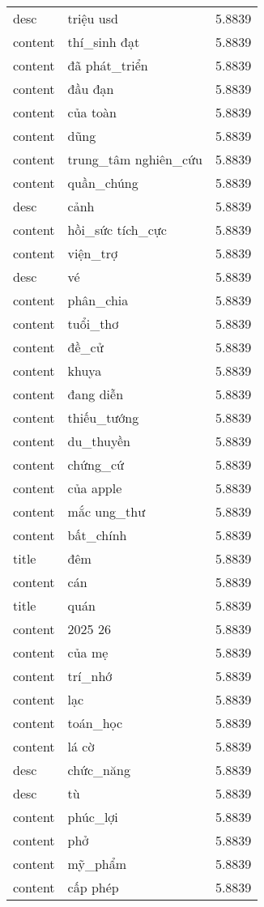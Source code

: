 \documentclass{article}
\begin{document}
\begin{tabular}{lll}
desc & triệu usd & 5.8839\\
content & thí\_sinh đạt & 5.8839\\
content & đã phát\_triển & 5.8839\\
content & đầu đạn & 5.8839\\
content & của toàn & 5.8839\\
content & dũng & 5.8839\\
content & trung\_tâm nghiên\_cứu & 5.8839\\
content & quần\_chúng & 5.8839\\
desc & cảnh & 5.8839\\
content & hồi\_sức tích\_cực & 5.8839\\
content & viện\_trợ & 5.8839\\
desc & vé & 5.8839\\
content & phân\_chia & 5.8839\\
content & tuổi\_thơ & 5.8839\\
content & đề\_cử & 5.8839\\
content & khuya & 5.8839\\
content & đang diễn & 5.8839\\
content & thiếu\_tướng & 5.8839\\
content & du\_thuyền & 5.8839\\
content & chứng\_cứ & 5.8839\\
content & của apple & 5.8839\\
content & mắc ung\_thư & 5.8839\\
content & bất\_chính & 5.8839\\
title & đêm & 5.8839\\
content & cán & 5.8839\\
title & quán & 5.8839\\
content & 2025 26 & 5.8839\\
content & của mẹ & 5.8839\\
content & trí\_nhớ & 5.8839\\
content & lạc & 5.8839\\
content & toán\_học & 5.8839\\
content & lá cờ & 5.8839\\
desc & chức\_năng & 5.8839\\
desc & tù & 5.8839\\
content & phúc\_lợi & 5.8839\\
content & phở & 5.8839\\
content & mỹ\_phẩm & 5.8839\\
content & cấp phép & 5.8839\\

\end{tabular}
\end{document}
